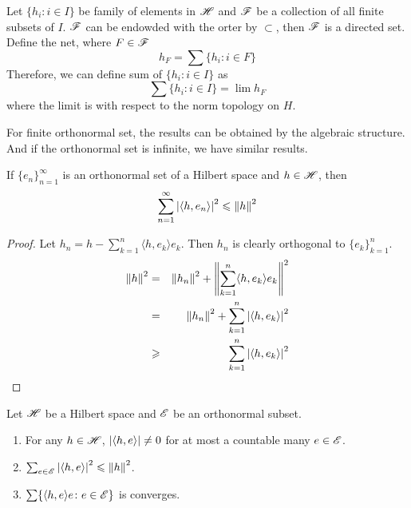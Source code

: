 \documentclass[a4paper,11pt]{report}
\begin{document}
\begin{defn}
	Let $\{h_i \colon i \in I\}$ be family of elements in $\mathscr{H}$ and $\mathscr{F}$ be a collection of all finite subsets of $I$. $\mathscr{F}$ can be endowded with the orter by $\subset$, then $\mathscr{F}$ is a directed set. Define the net, where $F \in \mathscr{F}$
	\begin{equation*}
		h_F = \sum \{h_i \colon i \in F\}
	\end{equation*}
	Therefore, we can define sum of $\{h_i \colon i \in I\}$ as
	\begin{equation*}
		\sum \{h_i \colon i \in I\} = \lim h_F
	\end{equation*}
	where the limit is with respect to the norm topology on $H$.
\end{defn}

For finite orthonormal set, the results can be obtained by the algebraic structure. And if the orthonormal set is infinite, we have similar results.
\begin{thm}
	If $\{e_n\}_{n=1}^{\infty}$ is an orthonormal set of a Hilbert space and $h \in \mathscr{H}$, then
	\begin{equation*}
		\sum_{n=1}^{\infty} \left\lvert \langle h,e_n \rangle\right\lvert^{2} \leqslant \left\lVert h\right\lVert^{2}
	\end{equation*}
\end{thm}
\begin{proof}
	Let $h_n=h-\sum_{k=1}^{n}  \langle h,e_k \rangle e_k$. Then $h_n$ is clearly orthogonal to $\{e_k\}_{k=1}^{n}$.
	\begin{eqnarray*}
		\left\lVert h\right\lVert^{2} &=& \left\lVert h_n\right\lVert^{2} + \left\lVert\sum_{k=1}^{n}  \langle h,e_k \rangle e_k\right\lVert^{2} \\
		&=& \left\lVert h_n\right\lVert^{2} + \sum_{k=1}^{n} \left\lvert \langle h,e_k \rangle \right\lvert^{2} \\
		&\geqslant& \sum_{k=1}^{n} \left\lvert \langle h,e_k \rangle \right\lvert^{2}
	\end{eqnarray*}	
\end{proof}
\begin{cor}
	Let $\mathscr{H}$ be a Hilbert space and $\mathscr{E}$ be an orthonormal subset. 
	\begin{enumerate}[label=\arabic*)]
		\item For any $h \in \mathscr{H}$, $\left\lvert \langle h,e \rangle \right\lvert \neq 0$ for at most a countable many $e \in \mathscr{E}$.
		\item $\sum_{e \in \mathscr{E}} \left\lvert \langle h,e \rangle \right\lvert^{2} \leqslant \left\lVert h\right\lVert^{2}$.
		\item $\sum \{ \langle h,e \rangle e \colon e \in \mathscr{E}\}$ is converges.
	\end{enumerate}
\end{cor}
\end{document}
